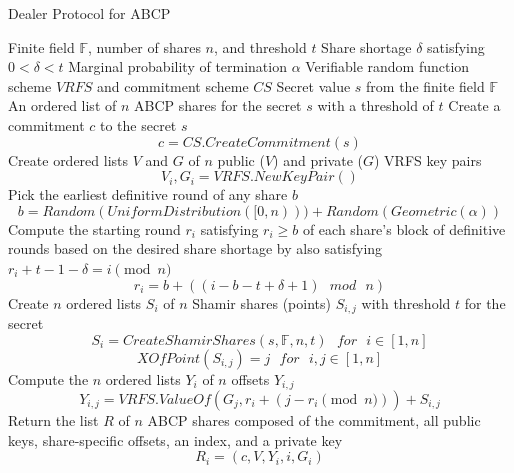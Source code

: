 \documentclass{dalcsthesis}
\begin{document}
\begin{algorithm}
  \caption{Dealer Protocol for ABCP}
  \label{alg:ABCP:Dealer}
  \begin{algorithmic}
    \INPUT Finite field $\mathbb{F}$, number of shares $n$, and threshold $t$
    \INPUT Share shortage $\delta$ satisfying $0 < \delta < t$
    \INPUT Marginal probability of termination $\alpha$
    \INPUT Verifiable random function scheme $VRFS$ and commitment scheme $CS$
    \INPUT Secret value $s$ from the finite field $\mathbb{F}$
    \OUTPUT An ordered list of $n$ ABCP shares for the secret $s$ with a threshold of $t$
    \STATE Create a commitment $c$ to the secret $s$
    	$$c = CS.CreateCommitment(s)$$
    \STATE Create ordered lists $V$ and $G$ of $n$ public ($V$) and private ($G$) VRFS key pairs
    	$$V_i, G_i = VRFS.NewKeyPair()$$
    \STATE Pick the earliest definitive round of any share $b$ 
	    $$b = Random(UniformDistribution([0,n))) + Random(Geometric(\alpha))$$
    \STATE Compute the starting round $r_i$ satisfying $r_i \geq b$ of each share's block of definitive rounds based on the desired share shortage by also satisfying $r_i + t - 1 - \delta = i \pmod{n}$
  	    $$r_i = b + ((i-b-t+\delta+1) \text{ } mod \text{ } n)$$
    \STATE Create $n$ ordered lists $S_i$ of $n$ Shamir shares (points) $S_{i,j}$ with threshold $t$ for the secret
  	    $$S_i = CreateShamirShares(s, \mathbb{F}, n, t) \text{ } for \text{ } i \in [1, n]$$
  	    $$XOfPoint(S_{i,j}) = j \text{ } for \text{ } i,j \in [1, n]$$
    \STATE Compute the $n$ ordered lists $Y_i$ of $n$ offsets $Y_{i,j}$
  	    $$Y_{i,j} = VRFS.ValueOf(G_j, r_i + (j-r_i \pmod{n})) + S_{i,j}$$
    \STATE Return the list $R$ of $n$ ABCP shares composed of the commitment, all public keys, share-specific offsets, an index, and a private key
    	$$R_i = (c, V, Y_i, i, G_i)$$
  \end{algorithmic}
\end{algorithm}
\end{document}
